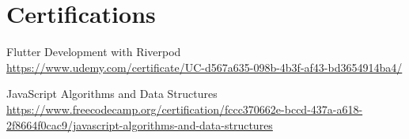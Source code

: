\documentclass[letterpaper,10.8pt]{article}
\begin{document}
\section{Certifications}
\begin{description}[font=$\bullet$]
\item {Flutter Development with Riverpod} \\  \vspace{2pt} \href{https://www.udemy.com/certificate/UC-d567a635-098b-4b3f-af43-bd3654914ba4/}{https://www.udemy.com/certificate/UC-d567a635-098b-4b3f-af43-bd3654914ba4/}
\item {JavaScript Algorithms and Data Structures} \\ \vspace{2pt}  \href{https://www.freecodecamp.org/certification/fccc370662e-bccd-437a-a618-2f8664f0cac9/javascript-algorithms-and-data-structures}{https://www.freecodecamp.org/certification/fccc370662e-bccd-437a-a618-2f8664f0cac9/javascript-algorithms-and-data-structures}
\end{description}
\end{document}
